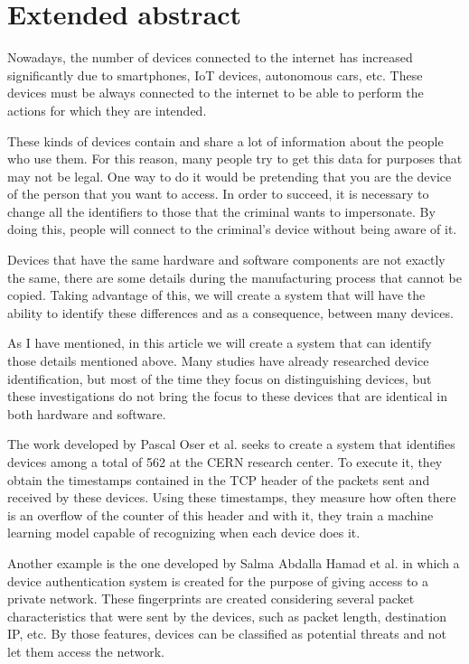 
\chapter*{Extended abstract}
 \label{chap:abstract}

Nowadays, the number of devices connected to the internet has increased significantly due to smartphones, IoT devices, autonomous cars, etc. These devices must be always connected to the internet to be able to perform the actions for which they are intended. 


These kinds of devices contain and share a lot of information about the people who use them. For this reason, many people try to get this data for purposes that may not be legal. One way to do it would be pretending that you are the device of the person that you want to access. In order to succeed, it is necessary to change all the identifiers to those that the criminal wants to impersonate. By doing this, people will connect to the criminal's device without being aware of it.


Devices that have the same hardware and software components are not exactly the same, there are some details during the manufacturing process that cannot be copied. Taking advantage of this, we will create a system that will have the ability to identify these differences and as a consequence, between many devices.


As I have mentioned, in this article we will create a system that can identify those details mentioned above. Many studies have already researched device identification, but most of the time they focus on distinguishing devices, but these investigations do not bring the focus to these devices that are identical in both hardware and software. 


The work developed by Pascal Oser et al. \cite{oser2018identifying} seeks to create a system that identifies devices among a total of 562 at the CERN research center. To execute it, they obtain the timestamps contained in the TCP header of the packets sent and received by these devices. Using these timestamps, they measure how often there is an overflow of the counter of this header and with it, they train a machine learning model capable of recognizing when each device does it.


Another example is the one developed by Salma Abdalla Hamad et al. \cite{hamad2019iot} in which a device authentication system is created for the purpose of giving access to a private network. These fingerprints are created considering several packet characteristics that were sent by the devices, such as packet length, destination IP, etc. By those features, devices can be classified as potential threats and not let them access the network. 


